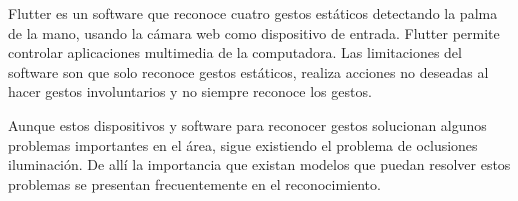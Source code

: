 Flutter es un software que reconoce cuatro gestos estáticos detectando la palma de la mano, usando la cámara web como dispositivo de entrada. Flutter permite controlar aplicaciones multimedia de la computadora. Las limitaciones del software son que solo reconoce gestos estáticos, realiza acciones no deseadas al hacer gestos involuntarios y no siempre reconoce los gestos.

Aunque estos dispositivos y software para reconocer gestos solucionan algunos problemas importantes en el área, sigue existiendo el problema de oclusiones iluminación.
De allí la importancia que existan modelos que puedan resolver estos problemas se presentan frecuentemente en el reconocimiento.





